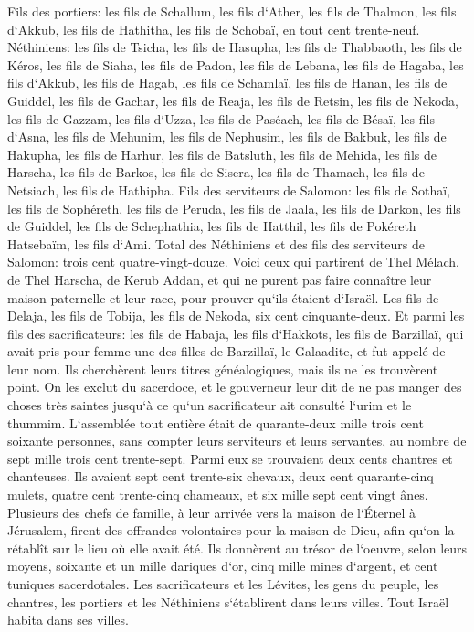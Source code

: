 \verse Fils des portiers: les fils de Schallum, les fils d`Ather, les fils de Thalmon, les fils d`Akkub, les fils de Hathitha, les fils de Schobaï, en tout cent trente-neuf. 
\verse Néthiniens: les fils de Tsicha, les fils de Hasupha, les fils de Thabbaoth, 
\verse les fils de Kéros, les fils de Siaha, les fils de Padon, 
\verse les fils de Lebana, les fils de Hagaba, les fils d`Akkub, 
\verse les fils de Hagab, les fils de Schamlaï, les fils de Hanan, 
\verse les fils de Guiddel, les fils de Gachar, les fils de Reaja, 
\verse les fils de Retsin, les fils de Nekoda, les fils de Gazzam, 
\verse les fils d`Uzza, les fils de Paséach, les fils de Bésaï, 
\verse les fils d`Asna, les fils de Mehunim, les fils de Nephusim, 
\verse les fils de Bakbuk, les fils de Hakupha, les fils de Harhur, 
\verse les fils de Batsluth, les fils de Mehida, les fils de Harscha, 
\verse les fils de Barkos, les fils de Sisera, les fils de Thamach, 
\verse les fils de Netsiach, les fils de Hathipha. 
\verse Fils des serviteurs de Salomon: les fils de Sothaï, les fils de Sophéreth, les fils de Peruda, 
\verse les fils de Jaala, les fils de Darkon, les fils de Guiddel, 
\verse les fils de Schephathia, les fils de Hatthil, les fils de Pokéreth Hatsebaïm, les fils d`Ami. 
\verse Total des Néthiniens et des fils des serviteurs de Salomon: trois cent quatre-vingt-douze. 
\verse Voici ceux qui partirent de Thel Mélach, de Thel Harscha, de Kerub Addan, et qui ne purent pas faire connaître leur maison paternelle et leur race, pour prouver qu`ils étaient d`Israël. 
\verse Les fils de Delaja, les fils de Tobija, les fils de Nekoda, six cent cinquante-deux. 
\verse Et parmi les fils des sacrificateurs: les fils de Habaja, les fils d`Hakkots, les fils de Barzillaï, qui avait pris pour femme une des filles de Barzillaï, le Galaadite, et fut appelé de leur nom. 
\verse Ils cherchèrent leurs titres généalogiques, mais ils ne les trouvèrent point. On les exclut du sacerdoce, 
\verse et le gouverneur leur dit de ne pas manger des choses très saintes jusqu`à ce qu`un sacrificateur ait consulté l`urim et le thummim. 
\verse L`assemblée tout entière était de quarante-deux mille trois cent soixante personnes, 
\verse sans compter leurs serviteurs et leurs servantes, au nombre de sept mille trois cent trente-sept. Parmi eux se trouvaient deux cents chantres et chanteuses. 
\verse Ils avaient sept cent trente-six chevaux, deux cent quarante-cinq mulets, 
\verse quatre cent trente-cinq chameaux, et six mille sept cent vingt ânes. 
\verse Plusieurs des chefs de famille, à leur arrivée vers la maison de l`Éternel à Jérusalem, firent des offrandes volontaires pour la maison de Dieu, afin qu`on la rétablît sur le lieu où elle avait été. 
\verse Ils donnèrent au trésor de l`oeuvre, selon leurs moyens, soixante et un mille dariques d`or, cinq mille mines d`argent, et cent tuniques sacerdotales. 
\verse Les sacrificateurs et les Lévites, les gens du peuple, les chantres, les portiers et les Néthiniens s`établirent dans leurs villes. Tout Israël habita dans ses villes. 


